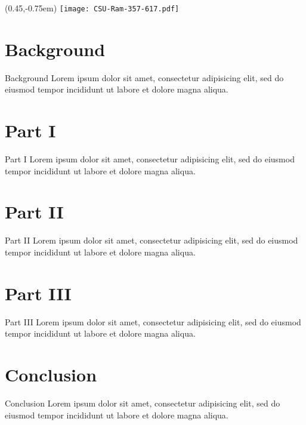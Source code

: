 \documentclass[xcolor=dvipsnames,10pt]{beamer}
\title{\TT}
\subtitle{}
\author{Author}
\institute{Colorado State University}
\date{\today}
\newcommand{\BG}{Background}
\newcommand{\PI}{Part I}
\newcommand{\PII}{Part II}
\newcommand{\PIII}{Part III}
\newcommand{\CO}{Conclusion}
\begin{document}
  \begin{frame}
    \begin{textblock*}{100mm}(0.45\textwidth,-0.75em)
      \texttt{[image: CSU-Ram-357-617.pdf]}
    \end{textblock*}
  \titlepage
  \end{frame}

  \begin{frame}
  \tableofcontents
  \end{frame}

  \section{\BG}
  \begin{frame}{\BG}
  Lorem ipsum dolor sit amet, consectetur adipisicing elit, sed do eiusmod tempor incididunt ut labore et dolore magna aliqua.
  \end{frame}

  \section{\PI}
  \begin{frame}{\PI}
  Lorem ipsum dolor sit amet, consectetur adipisicing elit, sed do eiusmod tempor incididunt ut labore et dolore magna aliqua.
  \end{frame}

  \section{\PII}
  \begin{frame}{\PII}
  Lorem ipsum dolor sit amet, consectetur adipisicing elit, sed do eiusmod tempor incididunt ut labore et dolore magna aliqua.
  \end{frame}

  \section{\PIII}
  \begin{frame}{\PIII}
  Lorem ipsum dolor sit amet, consectetur adipisicing elit, sed do eiusmod tempor incididunt ut labore et dolore magna aliqua.
  \end{frame}

  \section{\CO}
  \begin{frame}{\CO}
  Lorem ipsum dolor sit amet, consectetur adipisicing elit, sed do eiusmod tempor incididunt ut labore et dolore magna aliqua.
  \end{frame}
\end{document}
